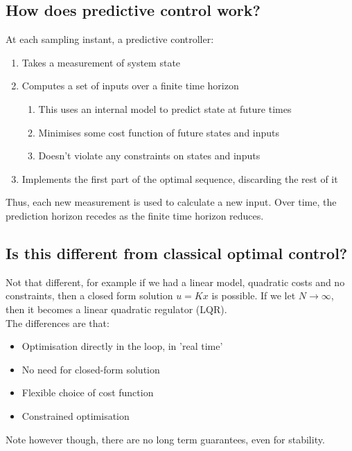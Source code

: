 \documentclass{article}
\begin{document}
\subsection{How does predictive control work?}
At each sampling instant, a predictive controller:
\begin{enumerate}
    \item Takes a measurement of system state
    \item Computes a set of inputs over a finite time horizon
    \begin{enumerate}
        \item This uses an internal model to predict state at future times
        \item Minimises some cost function of future states and inputs
        \item Doesn't violate any constraints on states and inputs
    \end{enumerate}
    \item Implements the first part of the optimal sequence, discarding the rest of it
\end{enumerate}
Thus, each new measurement is used to calculate a new input. Over time, the prediction horizon recedes as the finite time horizon reduces. 
\subsection{Is this different from classical optimal control?}
Not that different, for example if we had a linear model, quadratic costs and no constraints, then a closed form solution $u=Kx$ is possible. If we let $N \rightarrow \infty$, then it becomes a linear quadratic regulator (LQR). \\
The differences are that:
\begin{itemize}
    \item Optimisation directly in the loop, in 'real time'
    \item No need for closed-form solution
    \item Flexible choice of cost function
    \item Constrained optimisation
\end{itemize}
Note however though, there are no long term guarantees, even for stability.
\end{document}
